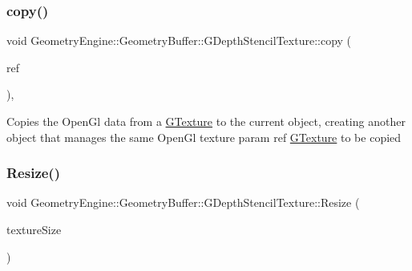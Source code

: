 \mbox{\label{class_geometry_engine_1_1_geometry_buffer_1_1_g_depth_stencil_texture_a80ef1aeb049b89848d7855f53107a9f0}} 
\subsubsection{\texorpdfstring{copy()}{copy()}}
{\footnotesize\ttfamily void Geometry\+Engine\+::\+Geometry\+Buffer\+::\+G\+Depth\+Stencil\+Texture\+::copy (\begin{DoxyParamCaption}\item[{const \mbox{\hyperlink{class_geometry_engine_1_1_geometry_buffer_1_1_g_depth_stencil_texture}{G\+Depth\+Stencil\+Texture}} \&}]{ref }\end{DoxyParamCaption})\hspace{0.3cm}{\ttfamily [protected]}, {\ttfamily [virtual]}}

Copies the Open\+Gl data from a \mbox{\hyperlink{class_geometry_engine_1_1_geometry_buffer_1_1_g_texture}{G\+Texture}} to the current object, creating another object that manages the same Open\+Gl texture param ref \mbox{\hyperlink{class_geometry_engine_1_1_geometry_buffer_1_1_g_texture}{G\+Texture}} to be copied \mbox{\label{class_geometry_engine_1_1_geometry_buffer_1_1_g_depth_stencil_texture_a692ca73521e51be802c981ab05029369}} 
\subsubsection{\texorpdfstring{Resize()}{Resize()}}
{\footnotesize\ttfamily void Geometry\+Engine\+::\+Geometry\+Buffer\+::\+G\+Depth\+Stencil\+Texture\+::\+Resize (\begin{DoxyParamCaption}\item[{const Q\+Vector2D \&}]{texture\+Size }\end{DoxyParamCaption})\hspace{0.3cm}{\ttfamily [virtual]}}


